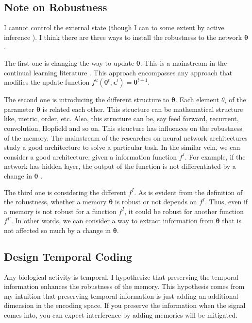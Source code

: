 \documentclass[12pt]{article}
\begin{document}
 \subsection{Note on Robustness}
 I cannot control the external state (though I can to some extent by active inference \cite{Friston10}). 
 I think there are three ways to install the robustness to the network $\bm{\theta}$. 
 
 The first one is changing the way to update $\bm{\theta}$. This is a mainstream in the continual learning literature \cite{Kirkpatrick17,Shin17}. 
 This approach encompasses any approach that modifies the update function $f^u(\bm{\theta}^t, \bm{\epsilon}^t) = \bm{\theta}^{t + 1}$.

 The second one is introducing the different structure to $\bm{\theta}$. Each element $\theta_i$ of the parameter $\bm{\theta}$ is related each other. 
 This structure can  be mathematical structure like, metric, order, etc. Also, this structure can be, say 
 feed forward, recurrent, convolution, Hopfield and so on. This structure has influences on the robustness of 
 the memory. The mainstream of the researches on neural network architectures study a good architecture to solve 
 a particular task. In the similar vein, we can consider a good architecture, given a information function $f^I$. 
 For example, if the network has hidden layer, the output of the function is not differentiated by a change in $\bm{\theta}$ \cite{Watanabe09,Amari06}.

 The third one is considering the different $f^I$. As is evident from the definition of the robustness, whether a memory $\bm{\theta}$ 
 is robust or not depends on $f^I$. Thus, even if a memory is not robust for a function $f^I$, it could be robust for another 
 function $f^{I'}$. In other words, we can consider a way to extract information from $\bm{\theta}$ that is not affected so much by 
 a change in $\bm{\theta}$.

 \subsection{Design Temporal Coding}
 Any biological activity is temporal. I hypothesize that preserving the temporal information enhances the robustness 
 of the memory. This hypothesis comes from my intuition that preserving temporal information is just adding an additional 
 dimension in the encoding space. If you preserve the information when the signal comes into, you can expect interference 
 by adding memories will be mitigated.







\end{document}
